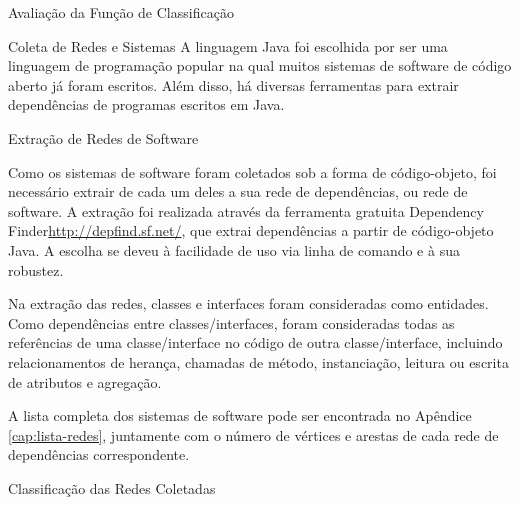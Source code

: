 \begin{section}{Avaliação da Função de Classificação}
\begin{subsection}{Coleta de Redes e Sistemas}
	A linguagem Java foi escolhida por ser uma linguagem de programação popular na qual muitos sistemas de software de código aberto já foram escritos. Além disso, há diversas ferramentas para extrair dependências de programas escritos em Java.

\end{subsection}

\begin{subsection}{Extração de Redes de Software}

	Como os sistemas de software foram coletados sob a forma de código-objeto, foi necessário extrair de cada um deles a sua rede de dependências, ou rede de software. A extração foi realizada através da ferramenta gratuita Dependency Finder\url{http://depfind.sf.net/}, que extrai dependências a partir de código-objeto Java. A escolha se deveu à facilidade de uso via linha de comando e à sua robustez.
	
	Na extração das redes, classes e interfaces foram consideradas como entidades. Como dependências entre classes/interfaces, foram consideradas todas as referências de uma classe/interface no código de outra classe/interface, incluindo relacionamentos de herança, chamadas de método, instanciação, leitura ou escrita de atributos e agregação.

	A lista completa dos sistemas de software pode ser encontrada no Apêndice \ref{cap:lista-redes}, juntamente com o número de vértices e arestas de cada rede de dependências correspondente.

\end{subsection}

\begin{subsection}{Classificação das Redes Coletadas}
	
	
	
	
	
	


\end{subsection}
\end{section}
